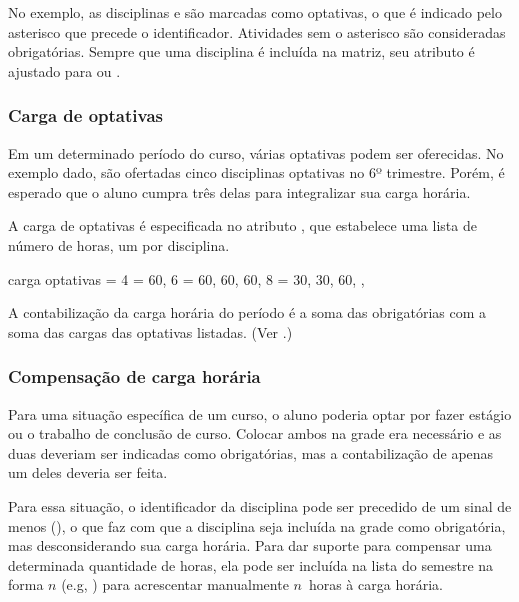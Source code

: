 \documentclass[a4paper, 11pt]{article}
\begin{document}

\bigskip
No exemplo, as disciplinas  e  são marcadas como optativas, o que é indicado pelo asterisco que precede o identificador. Atividades sem o asterisco são consideradas obrigatórias. Sempre que uma disciplina é incluída na matriz, seu atributo  é ajustado para  ou .

\subsubsection{Carga de optativas}\label{sec:carga-de-optativas}
Em um determinado período do curso, várias optativas podem ser oferecidas. No exemplo dado, são ofertadas cinco disciplinas optativas no 6º trimestre. Porém, é esperado que o aluno cumpra três delas para integralizar sua carga horária.

A carga de optativas é especificada no atributo , que estabelece uma lista de número de horas, um por disciplina.

\begin{PDListing}
    carga optativas = {
        4 = {60},
        6 = {60, 60, 60},
        8 = {30, 30, 60},
    },
\end{PDListing}

A contabilização da carga horária do período é a soma das obrigatórias com a soma das cargas das optativas listadas. (Ver .)

\subsubsection{Compensação de carga horária}\label{sec:compensacao-carga-horaria}
Para uma situação específica de um curso, o aluno poderia optar por fazer estágio ou o trabalho de conclusão de curso. Colocar ambos na grade era necessário e as duas deveriam ser indicadas como obrigatórias,  mas a contabilização de apenas um deles deveria ser feita.

Para essa situação, o identificador da disciplina pode ser precedido de um sinal de menos (\PDInline{-}), o que faz com que a disciplina seja incluída na grade como obrigatória, mas desconsiderando sua carga horária. Para dar suporte para compensar uma determinada quantidade de horas, ela pode ser incluída na lista do semestre na forma \PDInline{+}$n$ (e.g, ) para acrescentar manualmente $n$~horas à carga horária.
\end{document}
